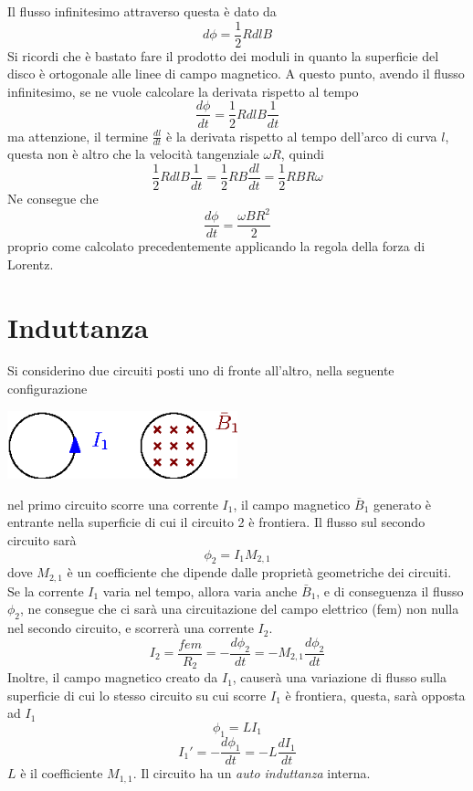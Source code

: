 \documentclass[10pt, letterpaper]{report}
\begin{document}
Il flusso infinitesimo attraverso questa è dato da 
$$ d\phi = \frac{1}{2}R dl B$$
Si ricordi che è bastato fare il prodotto dei moduli in quanto la superficie del disco è ortogonale alle linee di campo magnetico. A questo punto, avendo il flusso infinitesimo, se ne vuole calcolare la derivata rispetto al tempo 
$$ \frac{d\phi}{dt}=\frac{1}{2}R dl B\frac{1}{dt}$$
ma attenzione, il termine $\frac{dl}{dt}$ è la derivata rispetto al tempo dell'arco di curva $l$, questa non è altro che la velocità tangenziale $\omega R$, quindi 
$$  \frac{1}{2}R dl B\frac{1}{dt}= \frac{1}{2}RB\frac{dl}{dt}=\frac{1}{2}RBR\omega$$
Ne consegue che 
$$\frac{d\phi}{dt}=\frac{\omega B R^2}{2} $$
proprio come calcolato precedentemente applicando la regola della forza di Lorentz.
\flowerLine  
\section{Induttanza}
Si considerino due circuiti posti uno di fronte all'altro, nella 
seguente configurazione\begin{center}
    \includegraphics[width=0.5\textwidth ]{images/induttanza.eps}
\end{center}
nel primo circuito scorre una corrente $I_1$, il campo 
magnetico $\bar B_1$ generato è entrante nella superficie 
di cui il circuito 2 è frontiera. Il flusso sul secondo 
circuito sarà $$ \phi_2=I_1M_{2,1}$$
dove $M_{2,1}$ è un coefficiente che dipende dalle proprietà 
geometriche dei circuiti. Se la corrente $I_1$ varia nel 
tempo, allora varia anche $\bar B_1$, e di conseguenza 
il flusso $\phi_2$, ne consegue che ci sarà una 
circuitazione del campo elettrico (fem) non nulla nel 
secondo circuito, e scorrerà una corrente $I_2$. 
$$ I_2=\frac{fem}{R_2}=-\frac{d\phi_2}{dt}=-M_{2,1}\frac{d\phi_2}{dt}$$
Inoltre, il campo magnetico creato da $I_1$, causerà una 
variazione di flusso sulla superficie di cui lo stesso circuito 
su cui scorre $I_1$ è frontiera, questa, sarà opposta ad 
$I_1$ 
$$\phi_1=LI_1 $$
$$ I_1'=-\frac{d\phi_1}{dt}=-L\frac{dI_1}{dt}$$
$L$ è il coefficiente $M_{1,1}$. Il circuito ha un 
\textit{auto induttanza} interna.
\end{document}
